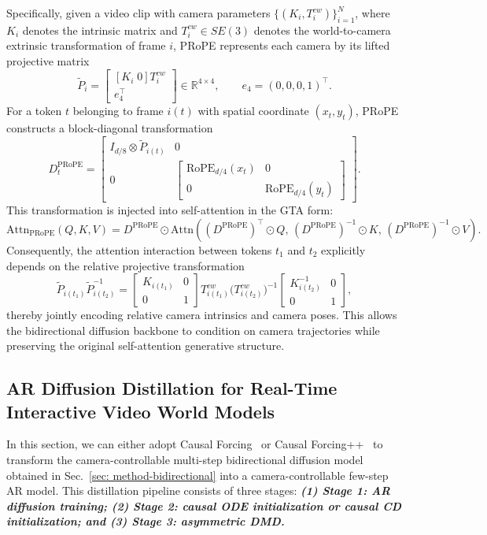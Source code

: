 Specifically, given a video clip with camera parameters 
$\{(K_i,T_i^{cw})\}_{i=1}^{N}$, where $K_i$ denotes the intrinsic matrix and 
$T_i^{cw}\in SE(3)$ denotes the world-to-camera extrinsic transformation of frame $i$, PRoPE represents each camera by its lifted projective matrix
\[
\widetilde P_i=
\begin{bmatrix}
[K_i\;0]T_i^{cw}\\
e_4^\top
\end{bmatrix}\in\mathbb{R}^{4\times 4},
\qquad
e_4=(0,0,0,1)^\top .
\]
For a token $t$ belonging to frame $i(t)$ with spatial coordinate $(x_t,y_t)$, PRoPE constructs a block-diagonal transformation
\[
D_t^{\mathrm{PRoPE}}
=
\begin{bmatrix}
I_{d/8}\otimes \widetilde P_{i(t)} & 0\\
0 &
\begin{bmatrix}
\mathrm{RoPE}_{d/4}(x_t)&0\\
0&\mathrm{RoPE}_{d/4}(y_t)
\end{bmatrix}
\end{bmatrix}.
\]
This transformation is injected into self-attention in the GTA form:
\[
\mathrm{Attn}_{\mathrm{PRoPE}}(Q,K,V)
=
D^{\mathrm{PRoPE}}\odot
\mathrm{Attn}\!\left(
(D^{\mathrm{PRoPE}})^\top\odot Q,\,
(D^{\mathrm{PRoPE}})^{-1}\odot K,\,
(D^{\mathrm{PRoPE}})^{-1}\odot V
\right).
\]
Consequently, the attention interaction between tokens $t_1$ and $t_2$ explicitly depends on the relative projective transformation
\[
\widetilde P_{i(t_1)}\widetilde P_{i(t_2)}^{-1}
=
\begin{bmatrix}
K_{i(t_1)}&0\\
0&1
\end{bmatrix}
T_{i(t_1)}^{cw}
\bigl(T_{i(t_2)}^{cw}\bigr)^{-1}
\begin{bmatrix}
K_{i(t_2)}^{-1}&0\\
0&1
\end{bmatrix},
\]
thereby jointly encoding relative camera intrinsics and camera poses. This allows the bidirectional diffusion backbone to condition on camera trajectories while preserving the original self-attention generative structure.


\subsection{AR Diffusion Distillation for Real-Time Interactive Video World Models}
\label{sec: method-ar}

In this section, we can either adopt Causal Forcing~\cite{zhu2026causal} or Causal Forcing++~\cite{zhao2026causal} to transform the camera-controllable multi-step bidirectional diffusion model obtained in Sec.~\ref{sec: method-bidirectional} into a camera-controllable few-step AR model. This distillation pipeline consists of three stages: \emph{\textbf{(1) Stage 1: AR diffusion training; (2) Stage 2: causal ODE initialization or causal CD initialization; and (3) Stage 3: asymmetric DMD.}} 

